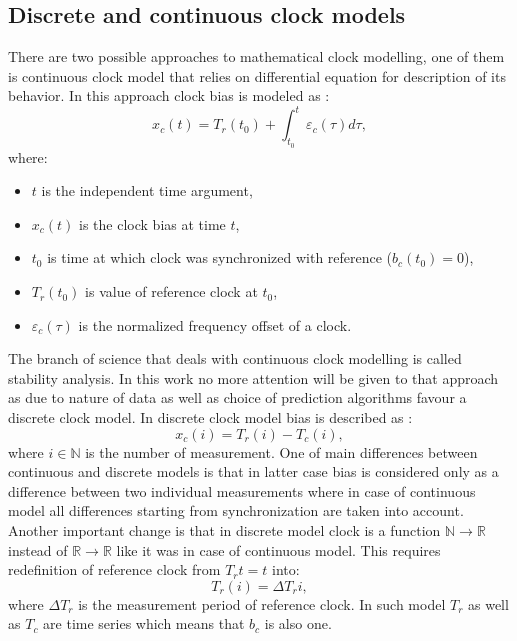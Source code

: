 \subsection{Discrete and continuous clock models}
There are two possible approaches to mathematical clock modelling, one of them is continuous
clock model that relies on differential equation for description of its behavior.
In this approach clock bias is modeled as :
\begin{equation}
	\label{equ:continous_clock}
	x_{c}(t) = T_{r}(t_{0}) +  \int_{t_{0}}^{t} \varepsilon_{c}(\tau) d\tau ,
\end{equation}
where:
\begin{itemize}
	\item $t$ is the independent time argument,
	\item $x_{c}(t)$ is the clock bias at time $t$,
	\item $t_{0}$ is time at which clock was synchronized with reference ($b_{c}(t_{0})=0$),
	\item $T_{r}(t_{0})$ is value of reference clock at $t_{0}$,
	\item $\varepsilon_{c}(\tau)$ is the normalized frequency offset of a clock.
\end{itemize}
The branch of science that deals with continuous clock modelling is called stability analysis.
In this work no more attention will be given to that approach as due to nature of data as well as
choice of prediction algorithms favour a discrete clock model.
In discrete clock model bias is described as :
\begin{equation}
	\label{equ:discrete_clock}
	x_{c}(i) = T_{r}(i) - T_{c}(i),
\end{equation}
where $i \in \mathbb{N}$ is the number of measurement.
One of main differences between continuous and discrete models is that in latter case bias is 
considered only as a difference between two individual measurements where in case of 
continuous model all differences starting from synchronization are taken into account.
Another important change is that in discrete model clock is a function $\mathbb{N} \to \mathbb{R}$
instead of $\mathbb{R} \to \mathbb{R}$ like it was in case of continuous model. 
This requires redefinition of reference clock from $T_r{t}=t$ into:
\begin{equation}
	\label{equ:discrete_reference}
	T_{r}(i) = \Delta T_r i,
\end{equation}
where $\Delta T_r$ is the measurement period of reference clock.
In such model $T_{r}$ as well as $T_{c}$ are time series which means that $b_{c}$ is also one.
